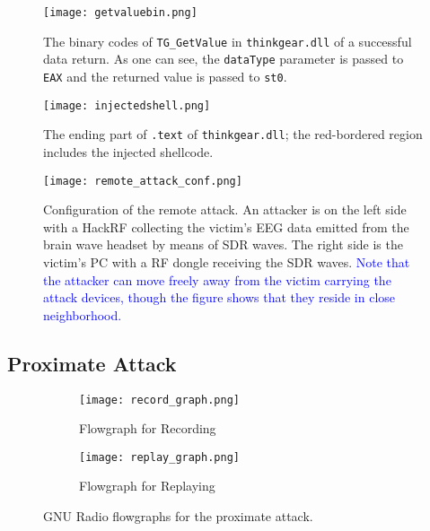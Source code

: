 \begin{figure}[!htb]
        \centering
        \texttt{[image: getvaluebin.png]}
        \caption{The binary codes of \texttt{TG\_GetValue} in \texttt{thinkgear.dll} of a successful data return. As one can see, the \texttt{dataType} parameter is passed to \texttt{EAX} and the returned value is passed to \texttt{st0}.}
        \label{fig:getvaluebin}
\end{figure}

\begin{figure}[!htb]
        \centering
        \texttt{[image: injectedshell.png]}
        \caption{The ending part of \texttt{.text} of \texttt{thinkgear.dll}; the red-bordered region includes the injected shellcode.}
        \label{fig:injectshell}
\end{figure}

\begin{figure}[!htb]
        \centering
        \texttt{[image: remote\_attack\_conf.png]}
        \caption{Configuration of the remote attack. An attacker is on the left side with a HackRF collecting the victim's EEG data emitted from the brain wave headset by means of SDR waves. The right side is the victim's PC with a RF dongle receiving the SDR waves. \textcolor{blue}{Note that the attacker can move freely away from the victim carrying the attack devices, though the figure shows that they reside in close neighborhood.}}
        \label{fig:remoteattackconf}
\end{figure}

\subsection{Proximate Attack}

\begin{figure*}[!htb]
        \begin{subfigure}[t]{0.8\textwidth}
              \centering
          \texttt{[image: record\_graph.png]}
                \caption{Flowgraph for Recording}
                \label{fig:recordgraph}
        \end{subfigure}
        \begin{subfigure}[t]{0.8\textwidth}
              \centering
          \texttt{[image: replay\_graph.png]}
                \caption{Flowgraph for Replaying}
                \label{fig:replaygraph}
        \end{subfigure}%
         \caption{GNU Radio flowgraphs for the proximate attack.}
         \label{fig:gnuflowgraph}
\end{figure*}

